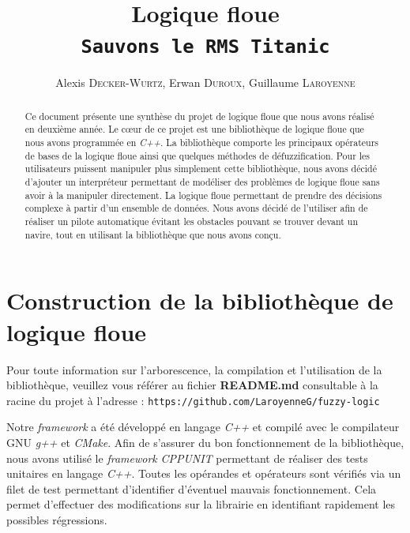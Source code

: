 \documentclass[a4paper,11pt]{article}
\title{\vspace*{3cm}Logique floue\\\texttt{Sauvons le RMS Titanic}}
\author{Alexis \textsc{Decker-Wurtz}, Erwan  \textsc{Duroux}, Guillaume  \textsc{Laroyenne}}
\begin{document}
    \maketitle

    \begin{abstract}

        \vspace*{2cm}

        Ce document présente une synthèse du projet de logique floue que nous avons réalisé en deuxième année.
        Le cœur de ce projet est une bibliothèque de logique floue que nous avons programmée en \textit{C++}. La bibliothèque comporte les principaux opérateurs de bases de la logique floue ainsi que quelques méthodes de défuzzification.
        Pour les utilisateurs puissent manipuler plus simplement cette bibliothèque, nous avons décidé d'ajouter un interpréteur permettant de modéliser des problèmes de logique floue sans avoir à la manipuler directement.
        La logique floue permettant de prendre des décisions complexe à partir d'un ensemble de données. Nous avons décidé de l'utiliser afin de réaliser un pilote automatique évitant les obstacles pouvant se trouver devant un navire, tout en utilisant la bibliothèque que nous avons conçu.
    \end{abstract}

    \newpage

    \section{Construction de la bibliothèque de logique floue}

    \begin{center}
        Pour toute information sur l'arborescence, la compilation et l'utilisation de la bibliothèque, veuillez vous référer au fichier \textbf{README.md} consultable à la racine du projet à l’adresse : \texttt{https://github.com/LaroyenneG/fuzzy-logic}
    \end{center}

    Notre \textit{framework} a été développé en langage \textit{C++} et compilé avec le compilateur GNU \textit{g++} et \textit{CMake}.
    Afin de s’assurer du bon fonctionnement de la bibliothèque, nous avons utilisé le \textit{framework} \textit{CPPUNIT} permettant de réaliser des tests unitaires en langage \textit{C++}.
    Toutes les opérandes et opérateurs sont vérifiés via un filet de test permettant d’identifier d’éventuel mauvais fonctionnement.
    Cela permet d'effectuer des modifications sur la librairie en identifiant rapidement les possibles régressions.
\end{document}
